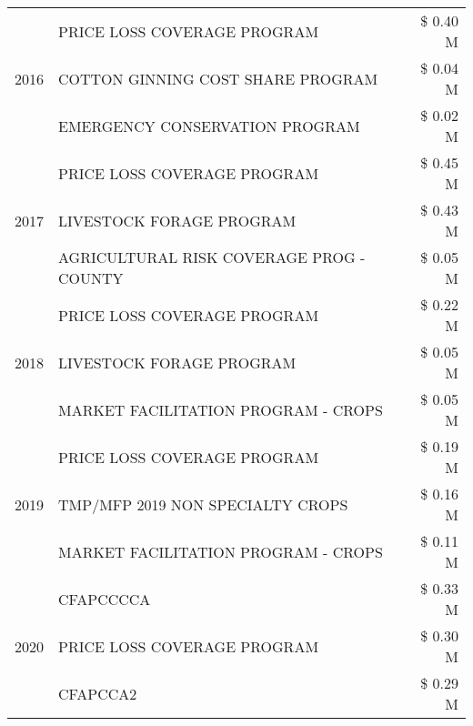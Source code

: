\begin{tabular}{llr}
\cline{1-3}
\multirow[t]{3}{*}{2016} & PRICE LOSS COVERAGE PROGRAM                   & \$ 0.40 M \\
 & COTTON GINNING COST SHARE PROGRAM             & \$ 0.04 M \\
 & EMERGENCY CONSERVATION PROGRAM                & \$ 0.02 M \\
\cline{1-3}
\multirow[t]{3}{*}{2017} & PRICE LOSS COVERAGE PROGRAM & \$ 0.45 M \\
 & LIVESTOCK FORAGE PROGRAM & \$ 0.43 M \\
 & AGRICULTURAL RISK COVERAGE PROG - COUNTY & \$ 0.05 M \\
\cline{1-3}
\multirow[t]{3}{*}{2018} & PRICE LOSS COVERAGE PROGRAM & \$ 0.22 M \\
 & LIVESTOCK FORAGE PROGRAM & \$ 0.05 M \\
 & MARKET FACILITATION PROGRAM - CROPS & \$ 0.05 M \\
\cline{1-3}
\multirow[t]{3}{*}{2019} & PRICE LOSS COVERAGE PROGRAM & \$ 0.19 M \\
 & TMP/MFP 2019 NON SPECIALTY CROPS & \$ 0.16 M \\
 & MARKET FACILITATION PROGRAM - CROPS & \$ 0.11 M \\
\cline{1-3}
\multirow[t]{3}{*}{2020} & CFAPCCCCA & \$ 0.33 M \\
 & PRICE LOSS COVERAGE PROGRAM & \$ 0.30 M \\
 & CFAPCCA2 & \$ 0.29 M \\
\cline{1-3}
\bottomrule
\end{tabular}
